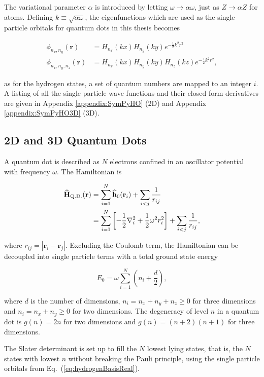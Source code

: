 The variational parameter $\alpha$ is introduced by letting $\omega\to\alpha\omega$, just as $Z\to\alpha Z$ for atoms. Defining $k\equiv\sqrt{\alpha\omega}$, the eigenfunctions which are used as the single particle orbitals for quantum dots in this thesis becomes

\begin{align}
\phi_{n_x, n_y}(\mathbf{r}) &= H_{n_x}(kx)H_{n_y}(ky)e^{-\frac{1}{2}k^2r^2} \\
\phi_{n_x, n_y, n_z}(\mathbf{r}) &= H_{n_x}(kx)H_{n_y}(ky)H_{n_z}(kz)e^{-\frac{1}{2}k^2r^2},
\end{align}

as for the hydrogen states, a set of quantum numbers are mapped to an integer $i$.  A listing of all the single particle wave functions and their closed form derivatives are given in Appendix \ref{appendix:SymPyHO} (2D) and Appendix \ref{appendix:SymPyHO3D} (3D). 


\subsection{2D and 3D Quantum Dots}

A quantum dot is described as $N$ electrons confined in an oscillator potential with frequency $\omega$. The Hamiltonian is

\begin{align}
 {\bf\widehat{H}}_{\mathrm{Q.D.}}(\mathbf{r}) &= \sum_{i=1}^N {\bf\widehat{h}}_0(\mathbf{r}_i) + \sum_{i<j} \frac{1}{r_{ij}} \\
                         &= \sum_{i=1}^N \left[-\frac{1}{2}\nabla_i^2 + \frac{1}{2}\omega^2r_i^2 \right] + \sum_{i<j} \frac{1}{r_{ij}},
\end{align}

where $r_{ij} = |\mathbf{r}_i -\mathbf{r}_j|$. Excluding the Coulomb term, the Hamiltonian can be decoupled into single particle terms with a total ground state energy

\begin{equation}
 E_0 = \omega\sum_{i=1}^N \left(n_i + \frac{d}{2}\right), \label{eq:qdotsE0}
\end{equation}

where $d$ is the number of dimensions, $n_i = n_x + n_y + n_z \ge 0$ for three dimensions and $n_i = n_x + n_y \ge 0$ for two dimensions. The degeneracy of level $n$ in a quantum dot is $g(n) = 2n$ for two dimensions and $g(n) = (n+2)(n+1)$ for three dimensions.

The Slater determinant is set up to fill the $N$ lowest lying states, that is, the $N$ states with lowest $n$ without breaking the Pauli principle, using the single particle orbitals from Eq.~(\ref{eq:hydrogenBasisReal}).


